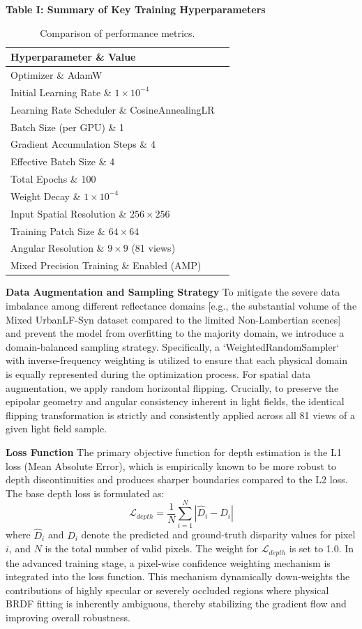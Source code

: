 \textbf{Table I: Summary of Key Training Hyperparameters}
\begin{table}[!t]
\caption{Comparison of performance metrics.}
\label{tab:comparison}
\centering
\begin{tabular}{ll}
\toprule
Hyperparameter \& Value \\
\midrule
Optimizer \& AdamW \\
Initial Learning Rate \& $1 \times 10^{-4}$ \\
Learning Rate Scheduler \& CosineAnnealingLR \\
Batch Size (per GPU) \& 1 \\
Gradient Accumulation Steps \& 4 \\
Effective Batch Size \& 4 \\
Total Epochs \& 100 \\
Weight Decay \& $1 \times 10^{-4}$ \\
Input Spatial Resolution \& $256 \times 256$ \\
Training Patch Size \& $64 \times 64$ \\
Angular Resolution \& $9 \times 9$ (81 views) \\
Mixed Precision Training \& Enabled (AMP) \\
\bottomrule
\end{tabular}
\end{table}
\textbf{Data Augmentation and Sampling Strategy}  
To mitigate the severe data imbalance among different reflectance domains  [e.g., the substantial volume of the Mixed UrbanLF-Syn dataset compared to the limited Non-Lambertian scenes] and prevent the model from overfitting to the majority domain, we introduce a domain-balanced sampling strategy. Specifically, a `WeightedRandomSampler` with inverse-frequency weighting is utilized to ensure that each physical domain is equally represented during the optimization process. For spatial data augmentation, we apply random horizontal flipping. Crucially, to preserve the epipolar geometry and angular consistency inherent in light fields, the identical flipping transformation is strictly and consistently applied across all 81 views of a given light field sample. 

\textbf{Loss Function}  
The primary objective function for depth estimation is the L1 loss (Mean Absolute Error), which is empirically known to be more robust to depth discontinuities and produces sharper boundaries compared to the L2 loss. The base depth loss is formulated as:
\begin{equation}
\label{eq:eq51}
\mathcal{L}_{depth} = \frac{1}{N} \sum_{i=1}^{N} \left| \hat{D}_i - D_i \right|
\end{equation}
where $\hat{D}_i$ and $D_i$ denote the predicted and ground-truth disparity values for pixel $i$, and $N$ is the total number of valid pixels. The weight for $\mathcal{L}_{depth}$ is set to 1.0. In the advanced training stage, a pixel-wise confidence weighting mechanism is integrated into the loss function. This mechanism dynamically down-weights the contributions of highly specular or severely occluded regions where physical BRDF fitting is inherently ambiguous, thereby stabilizing the gradient flow and improving overall robustness.

